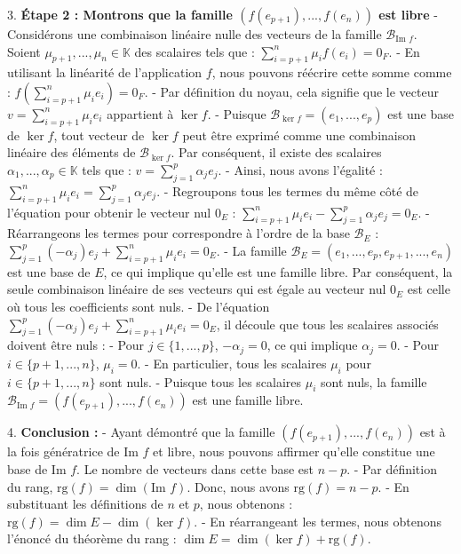 \documentclass{report}
\begin{document}
3.  \textbf{Étape 2 : Montrons que la famille $(f(e_{p+1}), ..., f(e_n))$ est libre}
    -   Considérons une combinaison linéaire nulle des vecteurs de la famille $\mathcal{B}_{\text{Im } f}$. Soient $\mu_{p+1}, ..., \mu_n \in \mathbb{K}$ des scalaires tels que :
        $\sum_{i=p+1}^n \mu_i f(e_i) = 0_F$.
    -   En utilisant la linéarité de l'application $f$, nous pouvons réécrire cette somme comme :
        $f\left(\sum_{i=p+1}^n \mu_i e_i\right) = 0_F$.
    -   Par définition du noyau, cela signifie que le vecteur $v = \sum_{i=p+1}^n \mu_i e_i$ appartient à $\ker f$.
    -   Puisque $\mathcal{B}_{\ker f} = (e_1, ..., e_p)$ est une base de $\ker f$, tout vecteur de $\ker f$ peut être exprimé comme une combinaison linéaire des éléments de $\mathcal{B}_{\ker f}$. Par conséquent, il existe des scalaires $\alpha_1, ..., \alpha_p \in \mathbb{K}$ tels que :
        $v = \sum_{j=1}^p \alpha_j e_j$.
    -   Ainsi, nous avons l'égalité :
        $\sum_{i=p+1}^n \mu_i e_i = \sum_{j=1}^p \alpha_j e_j$.
    -   Regroupons tous les termes du même côté de l'équation pour obtenir le vecteur nul $0_E$ :
        $\sum_{i=p+1}^n \mu_i e_i - \sum_{j=1}^p \alpha_j e_j = 0_E$.
    -   Réarrangeons les termes pour correspondre à l'ordre de la base $\mathcal{B}_E$ :
        $\sum_{j=1}^p (-\alpha_j) e_j + \sum_{i=p+1}^n \mu_i e_i = 0_E$.
    -   La famille $\mathcal{B}_E = (e_1, ..., e_p, e_{p+1}, ..., e_n)$ est une base de $E$, ce qui implique qu'elle est une famille libre. Par conséquent, la seule combinaison linéaire de ses vecteurs qui est égale au vecteur nul $0_E$ est celle où tous les coefficients sont nuls.
    -   De l'équation $\sum_{j=1}^p (-\alpha_j) e_j + \sum_{i=p+1}^n \mu_i e_i = 0_E$, il découle que tous les scalaires associés doivent être nuls :
        -   Pour $j \in \{1, ..., p\}$, $-\alpha_j = 0$, ce qui implique $\alpha_j = 0$.
        -   Pour $i \in \{p+1, ..., n\}$, $\mu_i = 0$.
    -   En particulier, tous les scalaires $\mu_i$ pour $i \in \{p+1, ..., n\}$ sont nuls.
    -   Puisque tous les scalaires $\mu_i$ sont nuls, la famille $\mathcal{B}_{\text{Im } f} = (f(e_{p+1}), ..., f(e_n))$ est une famille libre.

4.  \textbf{Conclusion :}
    -   Ayant démontré que la famille $(f(e_{p+1}), ..., f(e_n))$ est à la fois génératrice de $\text{Im } f$ et libre, nous pouvons affirmer qu'elle constitue une base de $\text{Im } f$. Le nombre de vecteurs dans cette base est $n - p$.
    -   Par définition du rang, $\text{rg}(f) = \dim(\text{Im } f)$. Donc, nous avons $\text{rg}(f) = n - p$.
    -   En substituant les définitions de $n$ et $p$, nous obtenons : $\text{rg}(f) = \dim E - \dim(\ker f)$.
    -   En réarrangeant les termes, nous obtenons l'énoncé du théorème du rang : $\dim E = \dim(\ker f) + \text{rg}(f)$.
\end{document}
